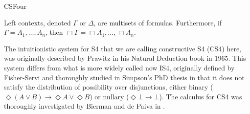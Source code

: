 \begin{entry}{CSFour}
\begin{calculus}
\end{calculus}

\begin{clarifications}
  Left contexts, denoted $\Gamma$ or $\Delta$, are multisets of
  formulas. Furthermore, if $\Gamma = A_1,\ldots,A_n$, then
  $\Box \Gamma = \Box A_1,\ldots,\Box A_n$.
\end{clarifications}

\begin{history}
 The intuitionistic system for S4 that we are calling constructive S4
 (CS4) here, was originally described by Prawitz in his Natural
 Deduction book\cite{prawitznatural} in 1965. This system differs from
 what is more widely called now IS4, originally defined by
 Fisher-Servi \cite{Fisher-Servi:1981} and thoroughly studied in
 Simpson's PhD thesis \cite{simpson1994phd} in that it does not
 satisfy the distribution of possibility over disjunctions, either
 binary ($\Diamond (A\lor B) \to \Diamond A \lor \Diamond B$) or
 nullary ($\Diamond \bot \to \bot$). The calculus for CS4 was
 thoroughly investigated by Bierman and de Paiva
 in \cite{bierman2000}.
\end{history}

\end{entry}
